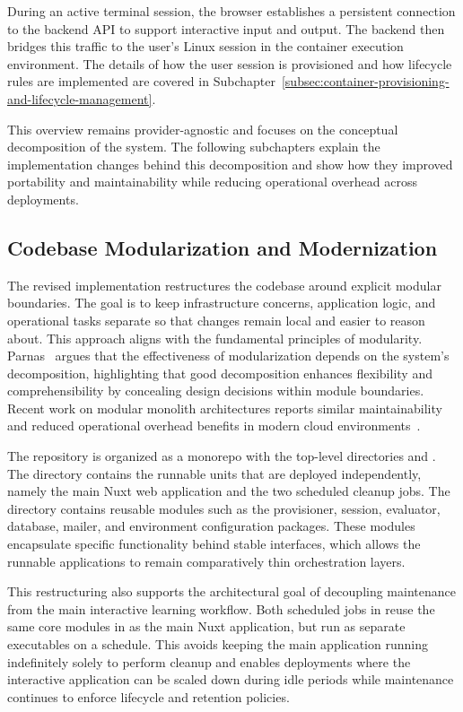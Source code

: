 During an active terminal session, the browser establishes a persistent connection to the backend API to support interactive input and output.
The backend then bridges this traffic to the user's Linux session in the container execution environment.
The details of how the user session is provisioned and how lifecycle rules are implemented are covered in Subchapter~\ref{subsec:container-provisioning-and-lifecycle-management}.

This overview remains provider-agnostic and focuses on the conceptual decomposition of the system.
The following subchapters explain the implementation changes behind this decomposition and show how they improved portability and maintainability while reducing operational overhead across deployments.

\subsection{Codebase Modularization and Modernization} \label{subsec:codebase-modularization-and-modernization}
The revised implementation restructures the codebase around explicit modular boundaries.
The goal is to keep infrastructure concerns, application logic, and operational tasks separate so that changes remain local and easier to reason about.
This approach aligns with the fundamental principles of modularity.
Parnas~\cite{parnas_criteria_1972} argues that the effectiveness of modularization depends on the system's decomposition, highlighting that good decomposition enhances flexibility and comprehensibility by concealing design decisions within module boundaries.
Recent work on modular monolith architectures reports similar maintainability and reduced operational overhead benefits in modern cloud environments~\cite{al-qoran_modular_2025}.

The repository is organized as a monorepo with the top-level directories  and .
The  directory contains the runnable units that are deployed independently, namely the main Nuxt web application and the two scheduled cleanup jobs.
The  directory contains reusable modules such as the provisioner, session, evaluator, database, mailer, and environment configuration packages.
These modules encapsulate specific functionality behind stable interfaces, which allows the runnable applications to remain comparatively thin orchestration layers.

This restructuring also supports the architectural goal of decoupling maintenance from the main interactive learning workflow.
Both scheduled jobs in  reuse the same core modules in  as the main Nuxt application, but run as separate executables on a schedule.
This avoids keeping the main application running indefinitely solely to perform cleanup and enables deployments where the interactive application can be scaled down during idle periods while maintenance continues to enforce lifecycle and retention policies.

